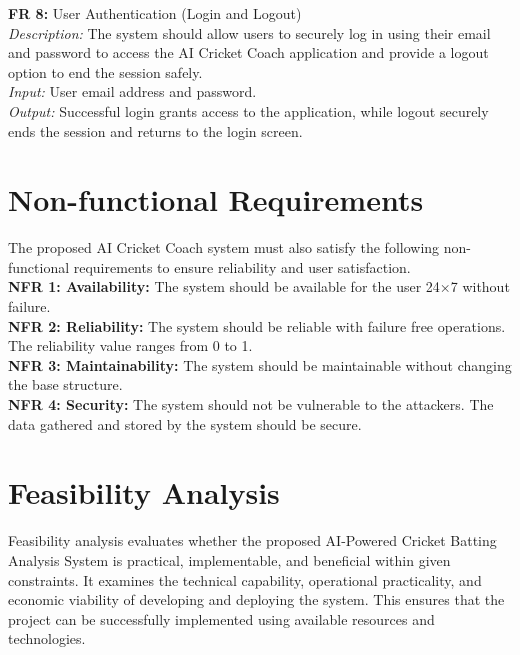 \noindent\textbf{FR 8:} User Authentication (Login and Logout)\\
\textit{Description:} The system should allow users to securely log in using their email and password to access the AI Cricket Coach application and provide a logout option to end the session safely.\\
\textit{Input:} User email address and password.\\
\textit{Output:} Successful login grants access to the application, while logout securely ends the session and returns to the login screen.\\


\section{Non-functional Requirements}	\label{S3.2}
The proposed AI Cricket Coach system must also satisfy the following non-functional
requirements to ensure reliability and user satisfaction.\\
\noindent\textbf{NFR 1: Availability:} The system should be available for the user 24×7 without failure.\\
\noindent\textbf{NFR 2: Reliability:} The system should be reliable with failure free operations. The reliability value ranges from 0 to 1.\\
\noindent\textbf{NFR 3: Maintainability:} The system should be maintainable without changing the base structure.\\
\noindent\textbf{NFR 4: Security:} The system should not be vulnerable to the attackers. The data gathered and stored by the system should be secure.

\section{Feasibility Analysis}  \label{S3.3}
Feasibility analysis evaluates whether the proposed AI-Powered Cricket Batting Analysis System is practical, implementable, and beneficial within given constraints. It examines the technical capability, operational practicality, and economic viability of developing and deploying the system. This ensures that the project can be successfully implemented using available resources and technologies.

